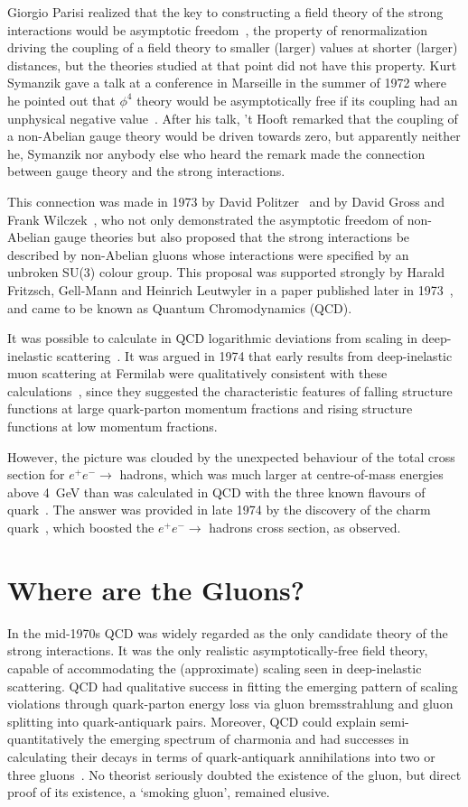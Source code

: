 \documentclass[12pt]{article} %
\begin{document}
Giorgio Parisi realized that the key to constructing a field theory of the strong
interactions would be asymptotic freedom~\cite{GP}, the property of renormalization
driving the coupling of a field theory to smaller (larger) values at shorter (larger)
distances, but the theories studied at that point did not have this property.
Kurt Symanzik gave a talk at a conference in Marseille in the summer of 1972
where he pointed out that $\phi^4$ theory would be asymptotically free if
its coupling had an unphysical negative value~\cite{KS}. After his talk, 't Hooft remarked
that the coupling of a non-Abelian gauge theory would be driven towards zero,
but apparently neither he, Symanzik nor anybody else who heard the remark
made the connection between gauge theory and the strong interactions.

This connection was made in 1973 by David Politzer~\cite{DP} and by David Gross and
Frank Wilczek~\cite{GW}, who not only demonstrated the asymptotic freedom of
non-Abelian gauge theories but also proposed that the strong interactions be
described by non-Abelian gluons whose interactions were specified by an
unbroken SU(3) colour group. This proposal was supported strongly by
Harald Fritzsch, Gell-Mann and Heinrich Leutwyler in a paper published
later in 1973~\cite{FGL}, and came to be known as Quantum Chromodynamics (QCD).

It was possible to calculate in QCD logarithmic deviations from scaling in
deep-inelastic scattering~\cite{GPGW}. It was argued in 1974 that early results from
deep-inelastic muon scattering at Fermilab were qualitatively consistent
with these calculations~\cite{London}, since they suggested the characteristic  features
of falling structure functions at large quark-parton momentum fractions
and rising structure functions at low momentum fractions.

However, the picture was clouded by the unexpected behaviour of the
total cross section for $e^+ e^- \to$ hadrons, which was much larger
at centre-of-mass energies above 4~GeV than was calculated in QCD
with the three known flavours of quark~\cite{JELondon}. The answer was provided in late
1974 by the discovery of the charm quark~\cite{RT}, which boosted the
$e^+ e^- \to$ hadrons cross section, as observed.

\section{Where are the Gluons?}

In the mid-1970s QCD was widely regarded as the only candidate theory of the strong interactions.
It was the only realistic asymptotically-free field theory, capable of
accommodating the (approximate) scaling seen in deep-inelastic scattering. QCD had
qualitative success in fitting the emerging pattern of scaling violations through quark-parton
energy loss via gluon bremsstrahlung and gluon splitting into quark-antiquark pairs. Moreover, QCD could
explain semi-quantitatively the emerging spectrum of charmonia and had successes in calculating their decays
in terms of quark-antiquark annihilations into two or three gluons~\cite{AP}.
No theorist seriously doubted the existence of the gluon, but direct proof of its existence,
a `smoking gluon', remained elusive.
\end{document}

